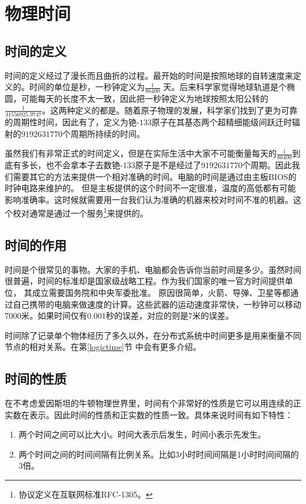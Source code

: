 \section{物理时间}

\subsection{时间的定义}

时间的定义经过了漫长而且曲折的过程。最开始的时间是按照地球的自转速度来定义的。时间的单位是秒，一秒钟定义为$\frac{1}{86400}$ 天。后来科学家觉得地球轨道是个椭圆，可能每天的长度不太一致，因此把一秒钟定义为地球按照太阳公转的$\frac{1}{31556925.9747}$。这两种定义的都是。随着原子物理的发展，科学家们找到了更为可靠的周期性时间，因此有了，定义为铯-$133$原子在其基态两个超精细能级间跃迁时辐射的$9192631770$个周期所持续的时间。



虽然我们有非常正式的时间定义，但是在实际生活中大家不可能衡量每天的$\frac{1}{86400}$到底有多长，也不会拿本子去数铯-$133$原子是不是经过了$9192631770$个周期。因此我们需要其它的方法来提供一个相对准确的时间。电脑的时间是通过由主板BIOS的时钟电路来维护的。 但是主板提供的这个时间不一定很准，温度的高低都有可能影响准确率。这时候就需要用一台我们认为准确的机器来校对时间不准的机器。这个校对通常是通过一个服务\footnote{协议定义在互联网标准RFC-1305。}来提供的。

\subsection{时间的作用}

时间是个很常见的事物。大家的手机、电脑都会告诉你当前时间是多少。虽然时间很普遍，时间的标准却是国家级战略工程。作为我们国家的唯一官方时间提供单位， 其成立需要国务院和中央军委批准。 原因很简单，火箭、导弹、卫星等都通过自己携带的电脑来做速度的计算。这些武器的运动速度非常快，一秒钟可以移动7000米。如果时间仅有0.001秒的误差，对应的则是7米的误差。

时间除了记录单个物体经历了多久以外，在分布式系统中时间更多是用来衡量不同节点的相对关系。在第\ref{logictime}节  中会有更多介绍。


\subsection{时间的性质}

在不考虑爱因斯坦的牛顿物理世界里，时间有个非常好的性质是它可以用连续的正实数在表示。因此时间的性质和正实数的性质一致。具体来说时间有如下特性：
\begin{enumerate}
    \item 两个时间之间可以比大小。时间大表示后发生，时间小表示先发生。
    \item 两个时间之间的时间间隔有比例关系。比如3小时时间间隔是1小时时间间隔的3倍。
\end{enumerate}

